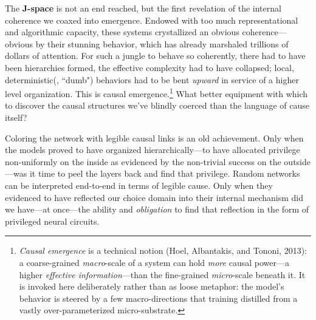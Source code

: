 \documentclass{article}
\begin{document}
The \textbf{J-space} is not an end reached, but the first revelation of the internal coherence we coaxed into emergence. Endowed with too much representational and algorithmic capacity, these systems crystallized an obvious coherence---obvious by their stunning behavior, which has already marshaled trillions of dollars of attention. For such a jungle to behave so coherently, there had to have been hierarchies formed, the effective complexity had to have collapsed; local, deterministic(, ``dumb") behaviors had to be bent \textit{upward} in service of a higher level organization. This is causal emergence.\footnote{\textit{Causal emergence} is a technical notion (Hoel, Albantakis, and Tononi, 2013): a coarse-grained \textit{macro}-scale of a system can hold \textit{more} causal power---a higher \textit{effective information}---than the fine-grained \textit{micro}-scale beneath it. It is invoked here deliberately rather than as loose metaphor: the model's behavior is steered by a few macro-directions that training distilled from a vastly over-parameterized micro-substrate.} What better equipment with which to discover the causal structures we've blindly coerced than the language of cause itself?

Coloring the network with legible causal links is an old achievement. Only when the models proved to have organized hierarchically---to have allocated privilege non-uniformly on the inside as evidenced by the non-trivial success on the outside---was it time to peel the layers back and find that privilege. Random networks can be interpreted end-to-end in terms of legible cause. Only when they evidenced to have reflected our choice domain into their internal mechanism did we have---at once---the ability and \textit{obligation} to find that reflection in the form of privileged neural circuits.


\end{document}
